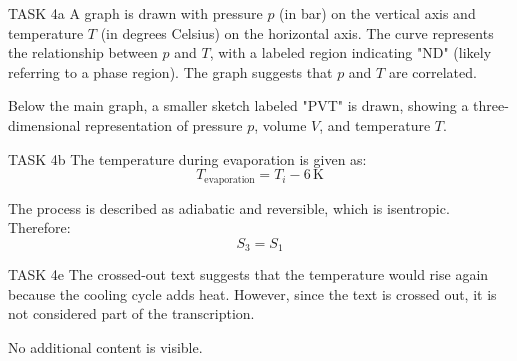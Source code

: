 TASK 4a  
A graph is drawn with pressure \( p \) (in bar) on the vertical axis and temperature \( T \) (in degrees Celsius) on the horizontal axis. The curve represents the relationship between \( p \) and \( T \), with a labeled region indicating "ND" (likely referring to a phase region). The graph suggests that \( p \) and \( T \) are correlated.  

Below the main graph, a smaller sketch labeled "PVT" is drawn, showing a three-dimensional representation of pressure \( p \), volume \( V \), and temperature \( T \).  

TASK 4b  
The temperature during evaporation is given as:  
\[
T_{\text{evaporation}} = T_i - 6 \, \text{K}
\]  

The process is described as adiabatic and reversible, which is isentropic. Therefore:  
\[
S_3 = S_1
\]  

TASK 4e  
The crossed-out text suggests that the temperature would rise again because the cooling cycle adds heat. However, since the text is crossed out, it is not considered part of the transcription.  

No additional content is visible.